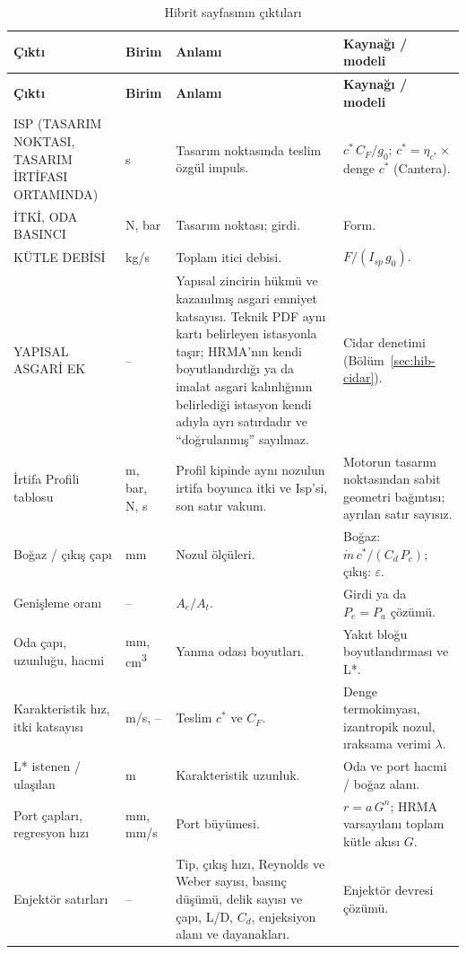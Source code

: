 \documentclass[11pt,a4paper]{article}
\newcommand{\ui}[1]{\textsf{#1}}
\begin{document}
\begin{longtable}{@{}>{\raggedright\arraybackslash}p{4.4cm}>{\raggedright\arraybackslash}p{1.3cm}>{\raggedright\arraybackslash}p{5.0cm}>{\raggedright\arraybackslash}p{4.9cm}@{}}
\caption{Hibrit sayfasının çıktıları}\label{tab:hib-cikti}\\
\toprule
\textbf{Çıktı} & \textbf{Birim} & \textbf{Anlamı} & \textbf{Kaynağı / modeli} \\
\midrule\endfirsthead
\toprule
\textbf{Çıktı} & \textbf{Birim} & \textbf{Anlamı} & \textbf{Kaynağı / modeli} \\
\midrule\endhead
\bottomrule\endlastfoot
\ui{ISP (TASARIM NOKTASI, TASARIM İRTİFASI ORTAMINDA)} & s & Tasarım noktasında teslim özgül impuls. & $c^*\,C_F/g_0$; $c^* = \eta_{c^*}\times$ denge $c^*$ (Cantera). \\
\ui{İTKİ}, \ui{ODA BASINCI} & N, bar & Tasarım noktası; girdi. & Form. \\
\ui{KÜTLE DEBİSİ} & kg/s & Toplam itici debisi. & $F/(I_{sp}\,g_0)$. \\
\ui{YAPISAL ASGARİ EK} & -- & Yapısal zincirin hükmü ve kazanılmış asgari emniyet katsayısı. Teknik PDF aynı kartı belirleyen istasyonla taşır; HRMA'nın kendi boyutlandırdığı ya da imalat asgari kalınlığının belirlediği istasyon kendi adıyla ayrı satırdadır ve ``doğrulanmış'' sayılmaz. & Cidar denetimi (Bölüm~\ref{sec:hib-cidar}). \\
\ui{İrtifa Profili} tablosu & m, bar, N, s & Profil kipinde aynı nozulun irtifa boyunca itki ve Isp'si, son satır vakum. & Motorun tasarım noktasından sabit geometri bağıntısı; ayrılan satır sayısız. \\
Boğaz / çıkış çapı & mm & Nozul ölçüleri. & Boğaz: $\dot m\,c^*/(C_d\,P_c)$; çıkış: $\varepsilon$. \\
Genişleme oranı & -- & $A_e/A_t$. & Girdi ya da $P_e = P_a$ çözümü. \\
Oda çapı, uzunluğu, hacmi & mm, cm\textsuperscript{3} & Yanma odası boyutları. & Yakıt bloğu boyutlandırması ve L*. \\
Karakteristik hız, itki katsayısı & m/s, -- & Teslim $c^*$ ve $C_F$. & Denge termokimyası, izantropik nozul, ıraksama verimi $\lambda$. \\
L* istenen / ulaşılan & m & Karakteristik uzunluk. & Oda ve port hacmi / boğaz alanı. \\
Port çapları, regresyon hızı & mm, mm/s & Port büyümesi. & $r = a\,G^n$; HRMA varsayılanı toplam kütle akısı $G$. \\
Enjektör satırları & -- & Tip, çıkış hızı, Reynolds ve Weber sayısı, basınç düşümü, delik sayısı ve çapı, L/D, $C_d$, enjeksiyon alanı ve dayanakları. & Enjektör devresi çözümü. \\

\end{longtable}
\end{document}
